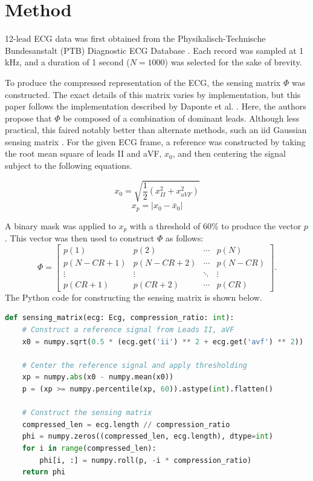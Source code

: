 \section{Method}

12-lead ECG data was first obtained from the Physikalisch-Technische Bundesanstalt (PTB) Diagnostic ECG Database \citep{physionet}.
Each record was sampled at 1 kHz, and a duration of 1 second (\(N=1000\)) was selected for the sake of brevity.
\newline
\par
To produce the compressed representation of the ECG, the sensing matrix \(\Phi\) was constructed.
The exact details of this matrix varies by implementation, but this paper follows the implementation described by Daponte et al. \citep{daponte2021}.
Here, the authors propose that \(\Phi\) be composed of a combination of dominant leads.
Although less practical, this faired notably better than alternate methods, such an iid Gaussian sensing matrix \citep{mishra2012}.
For the given ECG frame, a reference was constructed by taking the root mean square of leads II and aVF, \(x_0\), and then centering the signal subject to the following equations.

\[ x_0 = \sqrt{\frac{1}{2}(x_{II}^2 + x_{aVF}^2)} \]
\[ x_p = | x_0 - \bar{x}_0 | \]

A binary mask was applied to \(x_p\) with a threshold of 60\% to produce the vector \(p\).
This vector was then used to construct \(\Phi\) as follows:
\[
\Phi = \begin{bmatrix}
p(1) & p(2) & \cdots & p(N) \\
p(N-CR+1) & p(N-CR+2) & \cdots & p(N-CR) \\
\vdots & \vdots & \ddots & \vdots \\
p(CR+1) & p(CR+2) & \cdots & p(CR)
\end{bmatrix}.
\]
\newline
\noindent
The Python code for constructing the sensing matrix is shown below.

\begin{lstlisting}[language=Python, caption=Sensing Matrix Construction]
def sensing_matrix(ecg: Ecg, compression_ratio: int):
    # Construct a reference signal from Leads II, aVF
    x0 = numpy.sqrt(0.5 * (ecg.get('ii') ** 2 + ecg.get('avf') ** 2))

    # Center the reference signal and apply thresholding
    xp = numpy.abs(x0 - numpy.mean(x0))
    p = (xp >= numpy.percentile(xp, 60)).astype(int).flatten()

    # Construct the sensing matrix
    compressed_len = ecg.length // compression_ratio
    phi = numpy.zeros((compressed_len, ecg.length), dtype=int)
    for i in range(compressed_len):
        phi[i, :] = numpy.roll(p, -i * compression_ratio)
    return phi
\end{lstlisting}


